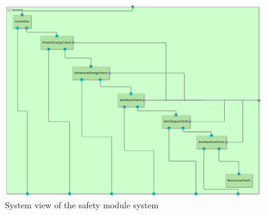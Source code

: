 \documentclass[12pt]{scrreprt}
\begin{document}
\par
\begin{figure}[H]
    \centering
    \includegraphics[width=\textwidth]{Figures/results/modelling_figures/system_view/system_view.png}
    \caption{System view of the safety module system}
    \label{fig:safety_module_system_view}
\end{figure}

\end{document}
